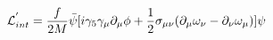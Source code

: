 \begin{equation}
{\cal L}_{int}^{'} = \frac{f}{2M} \bar{\psi} [i \gamma_{5} \gamma_{\mu} 
\partial_{\mu} \phi + \frac{1}{2} \sigma_{\mu \nu} (\partial_{\mu} \omega_{\nu}
- \partial_{\nu} \omega_{\mu})] \psi          \label{eq:hq}
\end{equation}

